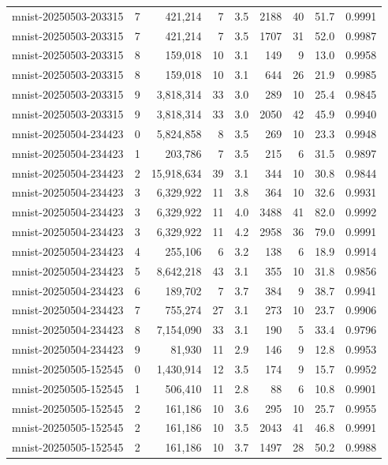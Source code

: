 \begin{tabular}{llrrrrrrr}
mnist-20250503-203315 & 7 & 421,214 & 7 & 3.5 & 2188 & 40 & 51.7 & 0.9991 \\
mnist-20250503-203315 & 7 & 421,214 & 7 & 3.5 & 1707 & 31 & 52.0 & 0.9987 \\
mnist-20250503-203315 & 8 & 159,018 & 10 & 3.1 & 149 & 9 & 13.0 & 0.9958 \\
mnist-20250503-203315 & 8 & 159,018 & 10 & 3.1 & 644 & 26 & 21.9 & 0.9985 \\
mnist-20250503-203315 & 9 & 3,818,314 & 33 & 3.0 & 289 & 10 & 25.4 & 0.9845 \\
mnist-20250503-203315 & 9 & 3,818,314 & 33 & 3.0 & 2050 & 42 & 45.9 & 0.9940 \\
mnist-20250504-234423 & 0 & 5,824,858 & 8 & 3.5 & 269 & 10 & 23.3 & 0.9948 \\
mnist-20250504-234423 & 1 & 203,786 & 7 & 3.5 & 215 & 6 & 31.5 & 0.9897 \\
mnist-20250504-234423 & 2 & 15,918,634 & 39 & 3.1 & 344 & 10 & 30.8 & 0.9844 \\
mnist-20250504-234423 & 3 & 6,329,922 & 11 & 3.8 & 364 & 10 & 32.6 & 0.9931 \\
mnist-20250504-234423 & 3 & 6,329,922 & 11 & 4.0 & 3488 & 41 & 82.0 & 0.9992 \\
mnist-20250504-234423 & 3 & 6,329,922 & 11 & 4.2 & 2958 & 36 & 79.0 & 0.9991 \\
mnist-20250504-234423 & 4 & 255,106 & 6 & 3.2 & 138 & 6 & 18.9 & 0.9914 \\
mnist-20250504-234423 & 5 & 8,642,218 & 43 & 3.1 & 355 & 10 & 31.8 & 0.9856 \\
mnist-20250504-234423 & 6 & 189,702 & 7 & 3.7 & 384 & 9 & 38.7 & 0.9941 \\
mnist-20250504-234423 & 7 & 755,274 & 27 & 3.1 & 273 & 10 & 23.7 & 0.9906 \\
mnist-20250504-234423 & 8 & 7,154,090 & 33 & 3.1 & 190 & 5 & 33.4 & 0.9796 \\
mnist-20250504-234423 & 9 & 81,930 & 11 & 2.9 & 146 & 9 & 12.8 & 0.9953 \\
mnist-20250505-152545 & 0 & 1,430,914 & 12 & 3.5 & 174 & 9 & 15.7 & 0.9952 \\
mnist-20250505-152545 & 1 & 506,410 & 11 & 2.8 & 88 & 6 & 10.8 & 0.9901 \\
mnist-20250505-152545 & 2 & 161,186 & 10 & 3.6 & 295 & 10 & 25.7 & 0.9955 \\
mnist-20250505-152545 & 2 & 161,186 & 10 & 3.5 & 2043 & 41 & 46.8 & 0.9991 \\
mnist-20250505-152545 & 2 & 161,186 & 10 & 3.7 & 1497 & 28 & 50.2 & 0.9988 \\

\end{tabular}
